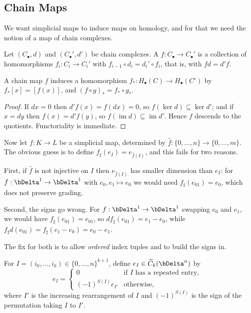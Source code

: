 \subsection{Chain Maps}

We want simplicial maps to induce maps on homology, and for that we need the notion of a
map of chain complexes.

\begin{definition}
	Let $(C_\bullet,d)$ and $(C_\bullet',d')$ be chain complexes. A  $f: C_\bullet \to C_\bullet'$ is a collection of homomorphisms $f_i: C_i \to C_i'$ with $f_{i-1}\circ d_i = d_i'\circ f_i$, that is, with $fd = d'f$.
\end{definition}

\begin{proposition} \label{prop:chain-map-induces}
	A chain map $f$ induces a homomorphism $f_*: H_\bullet(C) \to H_\bullet(C')$ by $f_*[x] = [f(x)]$, and $(f\circ g)_* = f_*\circ g_*$.
\end{proposition}
\begin{proof}
	If $dx = 0$ then $d'f(x) = f(dx) = 0$, so $f(\ker d)\subseteq \ker d'$; and if $x = dy$ then $f(x) = d'f(y)$, so $f(\operatorname{im}d)\subseteq\operatorname{im}d'$. Hence $f$ descends to the quotients. Functoriality is immediate.
\end{proof}

Now let $f: K \to L$ be a simplicial map, determined by
$\hat f: \{0,\dots,n\}\to\{0,\dots,m\}$. The obvious guess is to define
$f_\sharp(e_I) = e_{\hat f(I)}$, and this fails for two reasons.

First, if $\hat f$ is not injective on $I$ then $e_{\hat f(I)}$ has smaller dimension than
$e_I$: for $f: \bDelta^1 \to \bDelta^1$ with $e_0, e_1 \mapsto e_0$ we would need
$f_\sharp(e_{01}) = e_0$, which does not preserve grading.

Second, the signs go wrong. For $f: \bDelta^1\to\bDelta^1$ swapping $e_0$ and $e_1$, we
would have $f_\sharp(e_{01}) = e_{01}$, so $d f_\sharp(e_{01}) = e_1-e_0$, while
$f_\sharp d(e_{01}) = f_\sharp(e_1 - e_0) = e_0 - e_1$.

The fix for both is to allow \emph{ordered} index tuples and to build the signs in.

\begin{definition}
	For $I = (i_0,\dots,i_k) \in \{0,\dots,n\}^{k+1}$, define $e_I \in \widetilde C_k(\bDelta^n)$ by
	$$
	e_I = \begin{cases}0 & \text{if $I$ has a repeated entry},\\ (-1)^{S(I)}e_{I'} & \text{otherwise},\end{cases}
	$$
	where $I'$ is the increasing rearrangement of $I$ and $(-1)^{S(I)}$ is the sign of the permutation taking $I$ to $I'$.
\end{definition}


